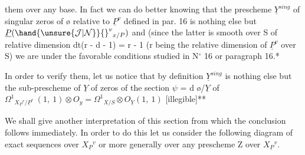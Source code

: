 
them over any base.  In fact we can do better knowing that the
prescheme $\underline{Y}^{sing}$ of singular zeros of \o{} relative to $\underline{P}^{v}$ defined in
par. 16 is nothing else but $\underline{P}(\hand{\unsure{\mathcal{J}|\mathcal{N}}}{}^{v}{}_{x/P})$ and (since the latter is
smooth over S of relative dimension dt(r - d - 1) = r - 1 (r being
the relative dimension of $\underline{P}^{v}$ over S) we are under the favorable
conditions studied in N$^\circ$ 16 or paragraph 16.*

In order to verify them, let us notice that by definition
$\underline{Y}^{sing}$ is nothing else but the sub-prescheme of $\underline{Y}$ of zeros of the
section $\psi$ = d \o/$\underline{Y}$ of $\Omega^{1}{}_{X_{\underline{P}}{}^{v}/\underline{P}^{v}}\ (1,\ 1) \otimes O_{y} = \Omega^{1}{}_{X/S} \otimes O_{\underline{Y}}(1,\ 1)$
[illegible]**

We shall give another interpretation of this section from
which the conclusion follows immediately.  In order to do this let
us consider the following diagram of exact sequences over $X_{\underline{P}}{}^{v}$ or
more generally over any prescheme Z over $X_{\underline{P}}{}^{v}$.


